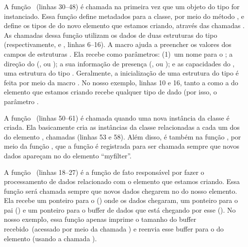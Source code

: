 A função ~(linhas 30--48) é chamada na primeira vez
que um objeto do tipo  for instanciado.  Essa função define
metadados para a classe, por meio do método ,
e define os tipos de  do novo elemento que estamos criando, através
das chamadas .  As chamadas dessa função
utilizam os dados de duas estruturas do tipo 
(respectivamente,  e , linhas 6--16).  A macro
 ajuda a preencher os valores dos campos de
estruturas .  Ela recebe como parâmetros: (1)~um nome
para o ; a direção do  (,
 ou ); a sua informação de presença
(,  ou ); e as
capacidades do , uma estrutura do tipo .  Geralmente, a
inicialização de uma estrutura do tipo  é feita por meio da macro
.  No nosso exemplo, linhas 10 e 16, tanto a 
como a  do elemento que estamos criando recebe qualquer tipo de
dado (por isso, o parâmetro .

A função ~(linhas 50--61) é chamada quando uma nova
instância da classe  é criada.  Ela basicamente cria as
instâncias da classe  relacionadas a cada um dos  do
elemento , chamadas  (linhas
53 e 58).  Além disso, é também na função , por meio da
função , que a função é registrada para ser
chamada sempre que novos dados apareçam no  do elemento
``myfilter''.

A função ~(linhas 18--27) é a função de fato responsável
por fazer o processamento de dados relacionado com o elemento que estamos
criando.  Essa função será chamada sempre que novos dados chegarem no
 do nosso elemento.  Ela recebe um ponteiro para o 
() onde os dados chegaram, um ponteiro para o pai () e
um ponteiro para o buffer de dados que está chegando por esse 
().  No nosso exemplo, essa função apenas imprime o tamanho do
buffer recebido~(acessado por meio da chamada ) e
reenvia esse buffer para o  do elemento (usando a chamada
).

